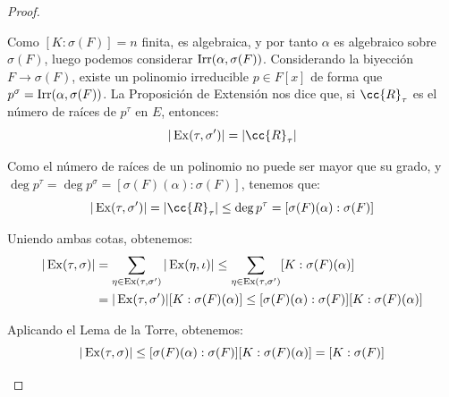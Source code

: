 \begin{prop}[Extensión II]
\begin{proof}
\begin{itemize}
\begin{description}
                    Como $[K:\sigma(F)] = n$ finita, es algebraica, y por tanto $\alpha$ es algebraico sobre $\sigma(F)$, luego podemos considerar $\operatorname{Irr}(\alpha,\sigma(F))$. Considerando la biyección $F\to \sigma(F)$, existe un polinomio irreducible $p\in F[x]$ de forma que $p^\sigma = \operatorname{Irr}(\alpha,\sigma(F))$. La Proposición de Extensión nos dice que, si $\cc{R}_\tau$ es el número de raíces de $p^\tau$ en $E$, entonces:
                    \begin{equation*}
                        |\Ex(\tau, \sigma')| = |\cc{R}_\tau|
                    \end{equation*}

                    Como el número de raíces de un polinomio no puede ser mayor que su grado, y $\deg p^\tau = \deg p^\sigma = [\sigma(F)(\alpha):\sigma(F)]$, tenemos que:
                    \begin{equation*}
                        |\Ex(\tau, \sigma')| = |\cc{R}_\tau| \leq \deg p^\tau = [\sigma(F)(\alpha):\sigma(F)]
                    \end{equation*}
                \end{description}

                Uniendo ambas cotas, obtenemos:
                \begin{align*}
                    |\operatorname{Ex}(\tau,\sigma)| &= \sum_{\eta \in  \operatorname{Ex}(\tau, \sigma')}|\operatorname{Ex}(\eta,\iota)| \leq \sum_{\eta \in  \operatorname{Ex}(\tau, \sigma')}[K:\sigma(F)(\alpha)] \\
                    &= |\operatorname{Ex}(\tau, \sigma')|[K:\sigma(F)(\alpha)] \leq [\sigma(F)(\alpha):\sigma(F)][K:\sigma(F)(\alpha)]
                \end{align*}


                Aplicando el Lema de la Torre, obtenemos:
                \begin{equation*}
                    |\operatorname{Ex}(\tau,\sigma)|  \leq [\sigma(F)(\alpha):\sigma(F)][K:\sigma(F)(\alpha)] = [K:\sigma(F)]
                \end{equation*}\qedhere
        \end{itemize}
    \end{proof}
\end{prop}

